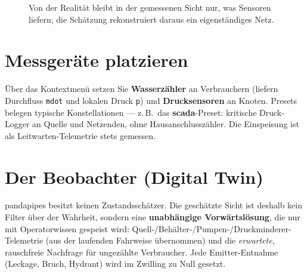 \documentclass[11pt,a4paper,parskip=half]{scrreprt}
\newcommand{\ui}[1]{\textsf{\bfseries #1}}      %
\begin{document}
\begin{figure}[t]
\centering
{}
\caption{Von der Realität bleibt in der gemessenen Sicht nur, was Sensoren
liefern; die Schätzung rekonstruiert daraus ein eigenständiges Netz.}
\label{fig:sichten}
\end{figure}

\section{Messgeräte platzieren}

Über das Kontextmenü setzen Sie \ui{Wasserzähler} an Verbrauchern (liefern
Durchfluss \texttt{mdot} und lokalen Druck \texttt{p}) und \ui{Drucksensoren} an
Knoten. Presets belegen typische Konstellationen — z.\,B.\ das \ui{scada}-Preset:
kritische Druck-Logger an Quelle und Netzenden, ohne Hausanschlusszähler. Die
Einspeisung ist als Leitwarten-Telemetrie stets gemessen.

\section{Der Beobachter (Digital Twin)}

pandapipes besitzt keinen Zustandsschätzer. Die geschätzte Sicht ist deshalb kein
Filter über der Wahrheit, sondern eine \textbf{unabhängige Vorwärtslösung}, die
nur mit Operatorwissen gespeist wird: Quell-/Behälter-/Pumpen-/Druckminderer-Tele\-metrie
(aus der laufenden Fahrweise übernommen) und die \emph{erwartete}, rauschfreie
Nachfrage für ungezählte Verbraucher. Jede Emitter-Entnahme (Leckage, Bruch,
Hydrant) wird im Zwilling zu Null gesetzt.
\end{document}
